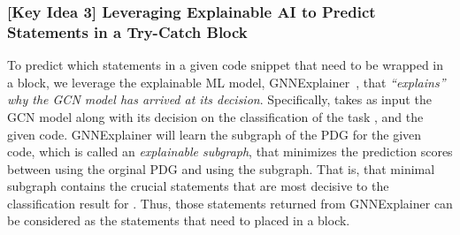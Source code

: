 


\subsubsection{{\bf [Key Idea 3] Leveraging Explainable AI to Predict Statements in a Try-Catch Block}} To predict which statements in a given code snippet that need to be
wrapped in a  block, we leverage the explainable ML
model, GNNExplainer~\cite{GNNExplainer}, that {\em ``explains'' why
  the GCN model has arrived at its decision}. Specifically, {\tool}
takes as input the GCN model along with its decision on the
classification of the task {\xblock}, and the given code.
GNNExplainer will learn the subgraph of the PDG for the given code,
which is called an {\em explainable subgraph}, that minimizes the
prediction scores between using the orginal PDG and using the
subgraph. That is, that minimal subgraph contains the crucial
statements that are most decisive to the classification result for
{\xblock}.  Thus, those statements returned from GNNExplainer can be
considered as the statements that need to placed in a 
block.
